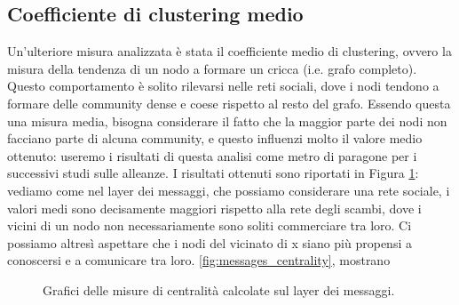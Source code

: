 \subsection{Coefficiente di clustering medio}
Un'ulteriore misura analizzata è stata il coefficiente medio di clustering, ovvero la misura della tendenza di un nodo a formare un cricca (i.e. grafo completo). Questo comportamento è solito rilevarsi nelle reti sociali, dove i nodi tendono a formare delle community dense e coese rispetto al resto del grafo. Essendo questa una misura media, bisogna considerare il fatto che la maggior parte dei nodi non facciano parte di alcuna community, e questo influenzi molto il valore medio ottenuto: useremo i risultati di questa analisi come metro di paragone per i successivi studi sulle alleanze. 
I risultati ottenuti sono riportati in Figura \ref{fig:clustering}: vediamo come nel layer dei messaggi, che possiamo considerare una rete sociale, i valori medi sono decisamente maggiori rispetto alla rete degli scambi, dove i vicini di un nodo non necessariamente sono soliti commerciare tra loro. Ci possiamo altresì aspettare che i nodi del vicinato di x siano più propensi a conoscersi e a comunicare tra loro.
\ref{fig:messages_centrality}, mostrano 
\begin{figure}
	\hfill
	\caption{Grafici delle misure di centralità calcolate sul layer dei messaggi.}
	\label{fig:clustering}
\end{figure}

